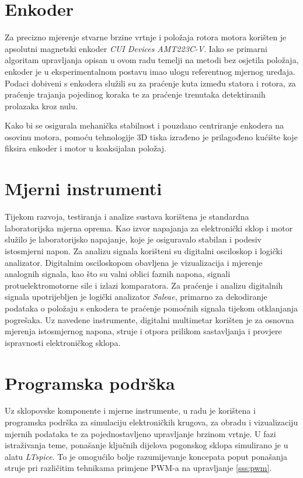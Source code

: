 \documentclass[diplomskirad]{fer}
\begin{document}
\section{Enkoder}
\label{sec:enkoder}

Za precizno mjerenje stvarne brzine vrtnje i položaja rotora motora korišten je
apsolutni magnetski enkoder \textit{CUI Devices AMT223C-V}. Iako se primarni
algoritam upravljanja opisan u ovom radu temelji na metodi bez osjetila
položaja, enkoder je u eksperimentalnom postavu imao ulogu referentnog mjernog
uređaja. Podaci dobiveni s enkodera služili su za praćenje kuta između statora
i rotora, za praćenje trajanja pojedinog koraka te za praćenje trenutaka
detektiranih prolazaka kroz nulu. 

Kako bi se osigurala mehanička stabilnost i pouzdano centriranje enkodera na
osovinu motora, pomoću tehnologije 3D tiska izrađeno je prilagođeno kućište
koje fiksira enkoder i motor u koaksijalan položaj. 

\section{Mjerni instrumenti}
\label{sec:mjerni_instrumenti}

Tijekom razvoja, testiranja i analize sustava korištena je standardna
laboratorijska mjerna oprema. Kao izvor napajanja za elektronički sklop i motor
služilo je laboratorijsko napajanje, koje je osiguravalo stabilan i podesiv
istosmjerni napon. Za analizu signala korišteni su digitalni osciloskop i
logički analizator. Digitalnim osciloskopom obavljena je vizualizacija i
mjerenje analognih signala, kao što su valni oblici faznih napona, signali
protuelektromotorne sile i izlazi komparatora. Za praćenje i analizu digitalnih
signala upotrijebljen je logički analizator \textit{Saleae}, primarno za
dekodiranje podataka o položaju s enkodera te praćenje pomoćnih signala tijekom
otklanjanja pogrešaka. Uz navedene instrumente, digitalni multimetar korišten
je za osnovna mjerenja istosmjernog napona, struje i otpora prilikom
sastavljanja i provjere ispravnosti elektroničkog sklopa.

\section{Programska podrška}
\label{sec:programska_podrska}

Uz sklopovske komponente i mjerne instrumente, u radu je korištena i programska
podrška za simulaciju elektroničkih krugova, za obradu i vizualizaciju mjernih
podataka te za pojednostavljeno upravljanje brzinom vrtnje. U fazi istraživanja
teme, ponašanje ključnih dijelova pogonskog sklopa simulirano je u alatu
\textit{LTspice}. To je omogućilo bolje razumijevanje koncepata poput ponašanja
struje pri različitim tehnikama primjene PWM-a na upravljanje \ref{sss:pwm}.
\end{document}
